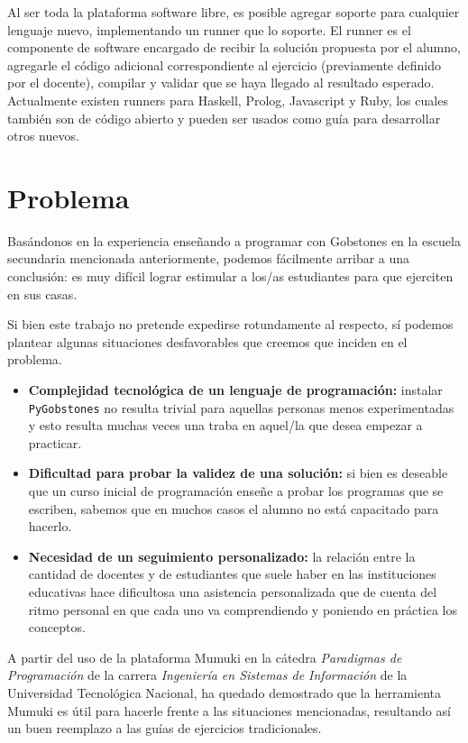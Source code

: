 \documentclass[a4paper,10pt]{article}
\begin{document}
Al ser toda la plataforma software libre, es posible agregar soporte para cualquier lenguaje nuevo, implementando un runner\cite{runner} que lo soporte. El runner es el componente de software encargado de recibir la solución propuesta por el alumno, agregarle el código adicional correspondiente al ejercicio (previamente definido por el docente), compilar y validar que se haya llegado al resultado esperado. Actualmente existen runners para Haskell, Prolog, Javascript y Ruby, los cuales también son de código abierto y pueden ser usados como guía para desarrollar otros nuevos.

\section{Problema}
Basándonos en la experiencia enseñando a programar con Gobstones en la escuela secundaria mencionada anteriormente, podemos fácilmente arribar a una conclusión: es muy difícil lograr estimular a los/as estudiantes para que ejerciten en sus casas.

Si bien este trabajo no pretende expedirse rotundamente al respecto, sí podemos plantear algunas situaciones desfavorables que creemos que inciden en el problema.

\begin{itemize}
    \item \textbf{Complejidad tecnológica de un lenguaje de programación:} instalar \texttt{PyGobstones} no resulta trivial para aquellas personas menos experimentadas y esto resulta muchas veces una traba en aquel/la que desea empezar a practicar.
    \item \textbf{Dificultad para probar la validez de una solución:} si bien es deseable que un curso inicial de programación enseñe a probar los programas que se escriben, sabemos que en muchos casos el alumno no está capacitado para hacerlo.
    \item \textbf{Necesidad de un seguimiento personalizado:} la relación entre la cantidad de docentes y de estudiantes que suele haber en las instituciones educativas hace dificultosa una asistencia personalizada que de cuenta del ritmo personal en que cada uno va comprendiendo y poniendo en práctica los conceptos. 
\end{itemize}

A partir del uso de la plataforma Mumuki en la cátedra \textit{Paradigmas de Programación} de la carrera \textit{Ingeniería en Sistemas de Información} de la Universidad Tecnológica Nacional, ha quedado demostrado que la herramienta Mumuki es útil para hacerle frente a las situaciones mencionadas, resultando así un buen reemplazo a las guías de ejercicios tradicionales.
\end{document}
